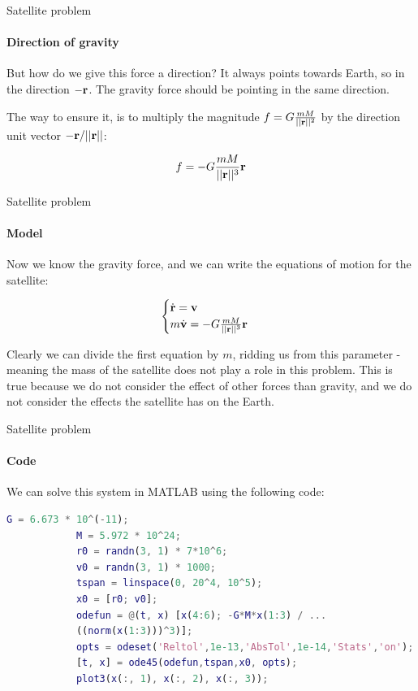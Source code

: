 \documentclass{beamer}
\begin{document}
\begin{frame}{Satellite problem}
\framesubtitle{Direction of gravity}
	\begin{flushleft}
		
		But how do we give this force a direction? It always points towards Earth, so in the direction $-\mathbf{r}$. The gravity force should be pointing in the same direction. 
		\bigskip
		
		The way to ensure it, is to multiply the magnitude $f = G \frac{m M}{||\mathbf{r}||^2}$ by the direction unit vector $-\mathbf{r} /  ||\mathbf{r}||$:
		
		\begin{equation}
			f = -G \frac{m M}{||\mathbf{r}||^3} \mathbf{r}
		\end{equation}		 
		
	\end{flushleft}
\end{frame}


\begin{frame}{Satellite problem}
	\framesubtitle{Model}
	\begin{flushleft}
		
		Now we know the gravity force, and we can write the equations of motion for the satellite:
		
		\begin{equation}
			\begin{cases}
				\dot{\mathbf{r}} = \mathbf{v} \\
				m \dot{\mathbf{v}} = -G \frac{m M}{||\mathbf{r}||^3} \mathbf{r}
			\end{cases}
		\end{equation}
	
	Clearly we can divide the first equation by $m$, ridding us from this parameter - meaning the mass of the satellite does not play a role in this problem. This is true because we do not consider the effect of other forces than gravity, and we do not consider the effects the satellite has on the Earth.
		
	\end{flushleft}
\end{frame}



\begin{frame}[fragile]{Satellite problem}
	\framesubtitle{Code}
	\begin{flushleft}
		
		We can solve this system in MATLAB using the following code:
		
		\begin{lstlisting}[language=Matlab]
			G = 6.673 * 10^(-11);
			M = 5.972 * 10^24;
			r0 = randn(3, 1) * 7*10^6;
			v0 = randn(3, 1) * 1000;
			tspan = linspace(0, 20^4, 10^5);
			x0 = [r0; v0];
			odefun = @(t, x) [x(4:6); -G*M*x(1:3) / ... 
			((norm(x(1:3)))^3)];
			opts = odeset('Reltol',1e-13,'AbsTol',1e-14,'Stats','on');
			[t, x] = ode45(odefun,tspan,x0, opts);
			plot3(x(:, 1), x(:, 2), x(:, 3));
		\end{lstlisting}
		
		
		
	\end{flushleft}
\end{frame}
\end{document}

